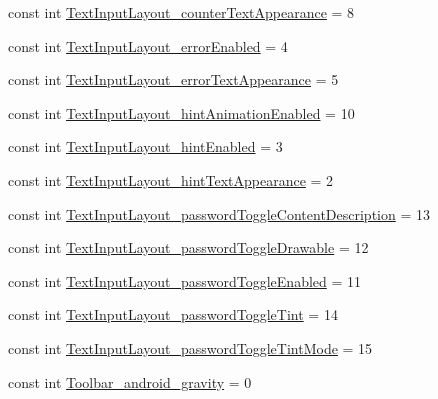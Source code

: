 \begin{DoxyCompactItemize}
\item 
const int \mbox{\hyperlink{class_f_w_p_s___app_1_1_droid_1_1_resource_1_1_styleable_aba32702334328a83bf88e61dc6991190}{Text\+Input\+Layout\+\_\+counter\+Text\+Appearance}} = 8
\item 
const int \mbox{\hyperlink{class_f_w_p_s___app_1_1_droid_1_1_resource_1_1_styleable_ac524a4760eac2e7b80d292f243e836d8}{Text\+Input\+Layout\+\_\+error\+Enabled}} = 4
\item 
const int \mbox{\hyperlink{class_f_w_p_s___app_1_1_droid_1_1_resource_1_1_styleable_ada10330a5d871ff0c8064d6b664bdf16}{Text\+Input\+Layout\+\_\+error\+Text\+Appearance}} = 5
\item 
const int \mbox{\hyperlink{class_f_w_p_s___app_1_1_droid_1_1_resource_1_1_styleable_aebef1cb406187b078bcdd2bf75632b21}{Text\+Input\+Layout\+\_\+hint\+Animation\+Enabled}} = 10
\item 
const int \mbox{\hyperlink{class_f_w_p_s___app_1_1_droid_1_1_resource_1_1_styleable_aaceaaa2e6b1f7ec4b580a82dce479bb4}{Text\+Input\+Layout\+\_\+hint\+Enabled}} = 3
\item 
const int \mbox{\hyperlink{class_f_w_p_s___app_1_1_droid_1_1_resource_1_1_styleable_a2b4f6f5e698d8796b1df027f55f2c37a}{Text\+Input\+Layout\+\_\+hint\+Text\+Appearance}} = 2
\item 
const int \mbox{\hyperlink{class_f_w_p_s___app_1_1_droid_1_1_resource_1_1_styleable_a364b208b83e996e9c37214c032fbd7f9}{Text\+Input\+Layout\+\_\+password\+Toggle\+Content\+Description}} = 13
\item 
const int \mbox{\hyperlink{class_f_w_p_s___app_1_1_droid_1_1_resource_1_1_styleable_acad1aca90b78593d5ca3b3b069f6a0ab}{Text\+Input\+Layout\+\_\+password\+Toggle\+Drawable}} = 12
\item 
const int \mbox{\hyperlink{class_f_w_p_s___app_1_1_droid_1_1_resource_1_1_styleable_a2d3ee49dc89adcc2c2616bdad073e43e}{Text\+Input\+Layout\+\_\+password\+Toggle\+Enabled}} = 11
\item 
const int \mbox{\hyperlink{class_f_w_p_s___app_1_1_droid_1_1_resource_1_1_styleable_a3a53852e771fc4cb6eb4058dad1883e3}{Text\+Input\+Layout\+\_\+password\+Toggle\+Tint}} = 14
\item 
const int \mbox{\hyperlink{class_f_w_p_s___app_1_1_droid_1_1_resource_1_1_styleable_a5b3632dd5d2db9e8fdf5034cad4f5fec}{Text\+Input\+Layout\+\_\+password\+Toggle\+Tint\+Mode}} = 15
\item 
const int \mbox{\hyperlink{class_f_w_p_s___app_1_1_droid_1_1_resource_1_1_styleable_acb8e5b879e8027e545cf5462ec21fcfd}{Toolbar\+\_\+android\+\_\+gravity}} = 0

\end{DoxyCompactItemize}
